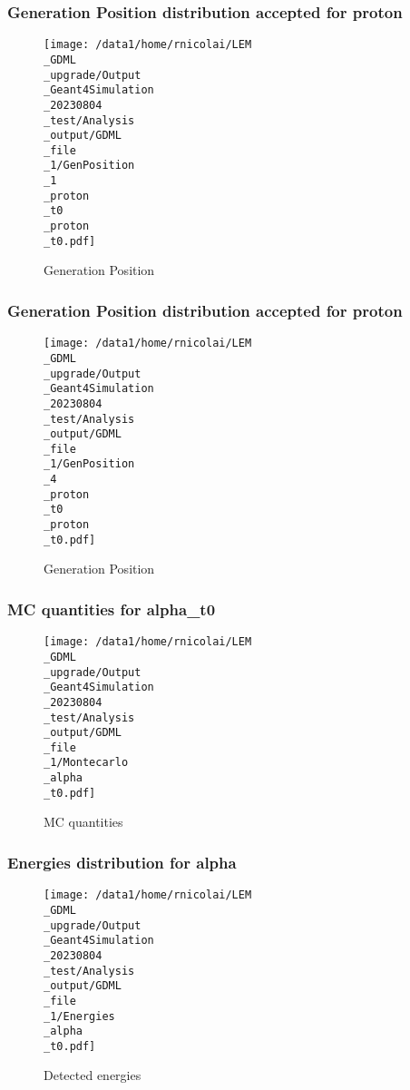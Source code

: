 \documentclass[8pt]{beamer}
\begin{document}
            \begin{frame}
                \frametitle{Generation Position distribution accepted for proton}
            
        \begin{figure}[h]
            \centering
            \texttt{[image: /data1/home/rnicolai/LEM\\\_GDML\\\_upgrade/Output\\\_Geant4Simulation\\\_20230804\\\_test/Analysis\\\_output/GDML\\\_file\\\_1/GenPosition\\\_1\\\_proton\\\_t0\\\_proton\\\_t0.pdf]}
            \caption{Generation Position}
        \end{figure}
        
            \end{frame}
            
            \begin{frame}
                \frametitle{Generation Position distribution accepted for proton}
            
        \begin{figure}[h]
            \centering
            \texttt{[image: /data1/home/rnicolai/LEM\\\_GDML\\\_upgrade/Output\\\_Geant4Simulation\\\_20230804\\\_test/Analysis\\\_output/GDML\\\_file\\\_1/GenPosition\\\_4\\\_proton\\\_t0\\\_proton\\\_t0.pdf]}
            \caption{Generation Position}
        \end{figure}
        
            \end{frame}
            
            \begin{frame}
                \frametitle{MC quantities for alpha\_t0}
            
        \begin{figure}[h]
            \centering
            \texttt{[image: /data1/home/rnicolai/LEM\\\_GDML\\\_upgrade/Output\\\_Geant4Simulation\\\_20230804\\\_test/Analysis\\\_output/GDML\\\_file\\\_1/Montecarlo\\\_alpha\\\_t0.pdf]}
            \caption{MC quantities}
        \end{figure}
        
            \end{frame}
            
            \begin{frame}
                \frametitle{Energies distribution for alpha}
            
        \begin{figure}[h]
            \centering
            \texttt{[image: /data1/home/rnicolai/LEM\\\_GDML\\\_upgrade/Output\\\_Geant4Simulation\\\_20230804\\\_test/Analysis\\\_output/GDML\\\_file\\\_1/Energies\\\_alpha\\\_t0.pdf]}
            \caption{Detected energies}
        \end{figure}
        
            \end{frame}
            
\end{document}
